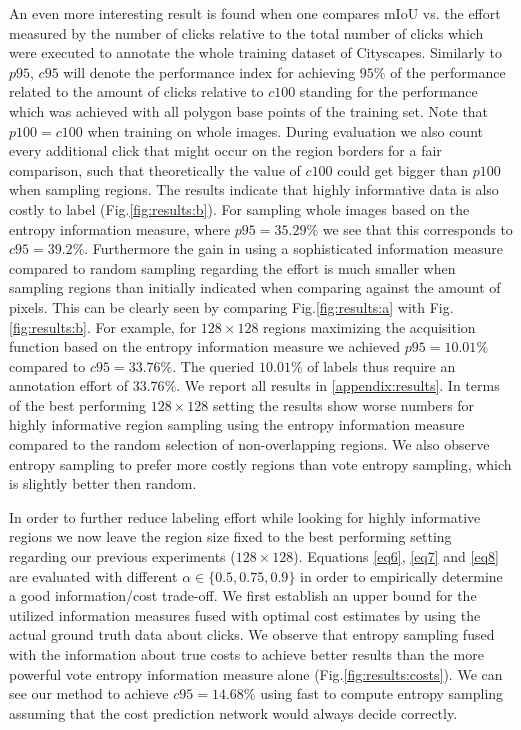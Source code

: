 \documentclass{bmvc2k}
\begin{document}
An even more interesting result is found when one compares mIoU vs. the effort measured by the number of clicks relative to the total number of clicks which were executed to annotate the whole training dataset of Cityscapes. Similarly to $p95$, $c95$ will denote the performance index for achieving $95\%$ of the performance related to the amount of clicks relative to $c100$ standing for the performance which was achieved with all polygon base points of the training set. Note that $p100=c100$ when training on whole images. During evaluation we also count every additional click that might occur on the region borders for a fair comparison, such that theoretically the value of $c100$ could get bigger than $p100$ when sampling regions. The results indicate that highly informative data is also costly to label (Fig.\ref{fig:results:b}). For sampling whole images based on the entropy information measure, where $p95=35.29\%$ we see that this corresponds to $c95=39.2\%$. Furthermore the gain in using a sophisticated information measure compared to random sampling regarding the effort is much smaller when sampling regions than initially indicated when comparing against the amount of pixels. This can be clearly seen by comparing  Fig.\ref{fig:results:a} with Fig.\ref{fig:results:b}. For example, for $128\times128$ regions maximizing the acquisition function based on the entropy information measure we achieved $p95=10.01\%$ compared to $c95=33.76\%$. The queried $10.01\%$ of labels thus require an annotation effort of $33.76\%$. We report all results in \ref{appendix:results}. In terms of the best performing $128\times128$ setting the results show worse numbers for highly informative region sampling using the entropy information measure compared to the random selection of non-overlapping regions. We also observe entropy sampling to prefer more costly regions than vote entropy sampling, which is slightly better then random. 

In order to further reduce labeling effort while looking for highly informative regions we now leave the region size fixed to the best performing setting regarding our previous experiments ($128\times128$). Equations \eqref{eq6}, \eqref{eq7} and \eqref{eq8} are evaluated with different $\alpha\in\{0.5, 0.75, 0.9\}$ in order to empirically determine a good information/cost trade-off. We first establish an upper bound for the utilized information measures fused with optimal cost estimates by using the actual ground truth data about clicks. We observe that entropy sampling fused with the information about true costs to achieve better results than the more powerful vote entropy information measure alone (Fig.\ref{fig:results:costs}). We can see our method to achieve $c95=14.68\%$ using fast to compute entropy sampling assuming that the cost prediction network would always decide correctly. 
\end{document}
